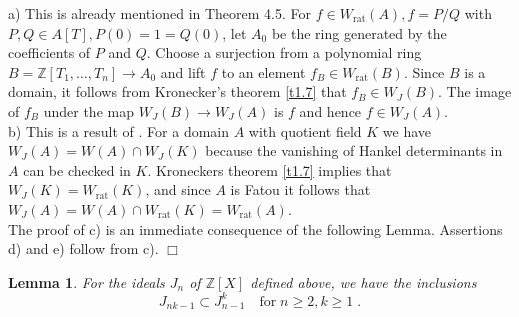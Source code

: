 \documentclass[12pt,leqno]{article}
\newcommand{\Z}{{\mathbb{Z}}}
\newcommand{\rat}{\mathrm{rat}}
\newtheorem{lemma}[theorem]{Lemma}
\newenvironment{proof}{\noindent {\bf Proof}}{\mbox{}\hspace*{\fill}$\Box$}
\begin{document}
\begin{proof}
a) This is already mentioned in \cite{H} Theorem 4.5. For $f \in W_{\rat} (A) ,f = P / Q$ with $P, Q \in A [T] , P (0) = 1 = Q (0)$, let $A_0$ be the ring generated by the coefficients of $P$ and $Q$. Choose a surjection from a polynomial ring $B = \Z [T_1 , \ldots , T_n] \to A_0$ and lift $f$ to an element $f_B \in W_{\rat} (B)$. Since $B$ is a domain, it follows from Kronecker's theorem \ref{t1.7} that $f_B \in W_J (B)$. The image of $f_B$ under the map $W_J (B) \to W_J (A)$ is $f$ and hence $f \in W_J (A)$.\\
b) This is a result of \cite{H}. For a domain $A$ with quotient field $K$ we have $W_J (A) = W (A) \cap W_J (K)$ because the vanishing of Hankel determinants in $A$ can be checked in $K$. Kroneckers theorem \ref{t1.7} implies that $W_J (K) = W_{\rat} (K)$, and since $A$ is Fatou it follows that $W_J (A) = W (A) \cap W_{\rat} (K) = W_{\rat} (A)$. \\
The proof of c) is an immediate consequence of the following Lemma. Assertions d) and e) follow from c). 
\end{proof}

\begin{lemma}
\label{t2.2}
For the ideals $J_n$ of $\Z  [X]$ defined above, we have the inclusions
\[
J_{nk-1} \subset J^k_{n-1} \quad \text{for} \; n \ge 2 , k \ge 1 \; .
\]
\end{lemma}
\end{document}
